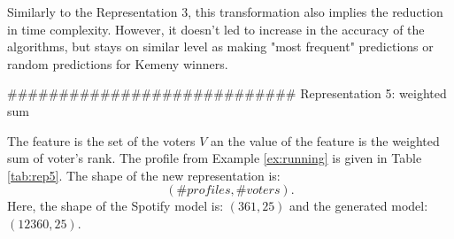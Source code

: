 Similarly to the Representation 3, this transformation also implies the reduction in time complexity. However, it doesn't led to increase in the accuracy of the algorithms, but stays on similar level as making "most frequent" predictions or random predictions for Kemeny winners. 

############################
Representation 5: weighted sum

The feature is the set of the voters $V$ an the value of the feature is the weighted sum of voter's rank. The profile from Example \ref{ex:running} is given in Table \ref{tab:rep5}.
The shape of the new representation is: $$(\#profiles, \#voters).$$
Here, the shape of the Spotify model is: $(361, 25)$ and the generated model: $(12360, 25)$.

